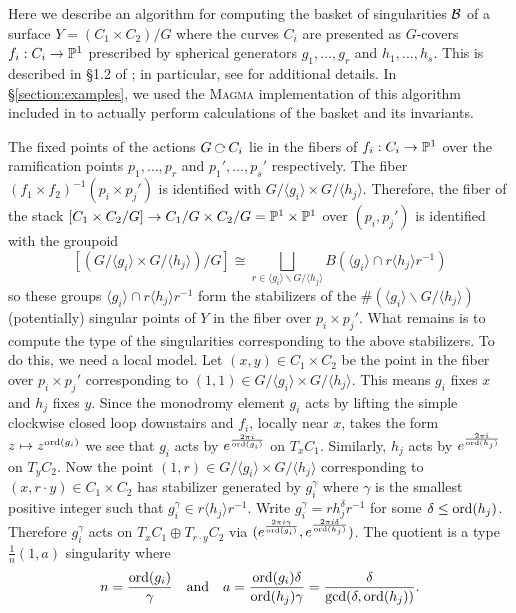\documentclass[main.tex]{subfiles}
\begin{document}
Here we describe an algorithm for computing the basket of singularities $\cB$ of a surface $Y = (C_1 \times C_2) / G$ where the curves $C_i$ are presented as $G$-covers $f_i : C_i \to \P^1$ prescribed by spherical generators $g_1, \dots, g_r$ and $h_1, \dots, h_s$. This is described in \S1.2 of \cite{bauer:classification}; in particular, see \cite[Proposition 1.17]{bauer:classification} for additional details. In \S\ref{section:examples}, we used the \textsc{Magma} implementation of this algorithm included in \cite{bauer:classification} to actually perform calculations of the basket and its invariants. 
\par 
The fixed points of the actions $G \acts C_i$ lie in the fibers of $f_i : C_i \to \P^1$ over the ramification points $p_1, \dots, p_r$ and $p_1', \dots, p_s'$ respectively. The fiber $(f_1 \times f_2)^{-1}(p_i \times p_j')$ is identified with $G / \langle g_i \rangle \times G / \langle h_j \rangle$. Therefore, the fiber of the stack $[C_1 \times C_2 / G] \to C_1/G \times C_2/G = \P^1 \times \P^1$ over $(p_i, p_j')$ is identified with the groupoid
\[ [(G/\langle g_i \rangle \times G/\langle h_j\rangle) / G] \cong \bigsqcup_{r \in \langle g_i \rangle \backslash G / \langle h_j \rangle} B (\langle g_i \rangle \cap r \langle h_j \rangle r^{-1})  \]
so these groups $\langle g_i \rangle \cap r \langle h_j \rangle r^{-1}$ form the stabilizers of the $\# (\langle g_i \rangle \backslash G / \langle h_j \rangle)$ (potentially) singular points of $Y$ in the fiber over $p_i \times p_j'$. What remains is to compute the type of the singularities corresponding to the above stabilizers. To do this, we need a local model. Let $(x, y) \in C_1 \times C_2$ be the point in the fiber over $p_i \times p_j'$ corresponding to $(1,1) \in G/\langle g_i \rangle \times G / \langle h_j \rangle$. This means $g_i$ fixes $x$ and $h_j$ fixes $y$. Since the monodromy element $g_i$ acts by lifting the simple clockwise closed loop downstairs and $f_i$, locally near $x$, takes the form  $z \mapsto z^{\ord(g_i)}$ we see that $g_i$ acts by $e^{\frac{2 \pi i}{\ord(g_i)}}$ on $T_x C_1$. Similarly, $h_j$ acts by $e^{\frac{2 \pi i}{\ord(h_j)}}$ on $T_y C_2$. Now the point $(1,r) \in G/\langle g_i \rangle \times G / \langle h_j \rangle$ corresponding to $(x, r \cdot y) \in C_1 \times C_2$ has stabilizer generated by $g_i^{\gamma}$ where $\gamma$ is the smallest positive integer such that $g_i^{\gamma} \in r \langle h_j \rangle r^{-1}$. Write $g_i^{\gamma} = r h_j^{\delta} r^{-1}$ for some $\delta \le \ord(h_j)$. Therefore $g_i^{\gamma}$ acts on $T_x C_1 \oplus T_{r \cdot y} C_2$ via $(e^{\frac{2 \pi i \gamma}{\ord(g_i)}}, e^{\frac{2 \pi i \delta}{\ord(h_j)}})$. The quotient is a type $\frac{1}{n} (1, a)$ singularity where 
\[ n = \frac{\ord(g_i)}{\gamma} \quad \text{and} \quad a = \frac{\ord(g_i) \delta}{\ord(h_j) \gamma} = \frac{\delta}{\gcd(\delta, \ord(h_j))}. \]
\end{document}

